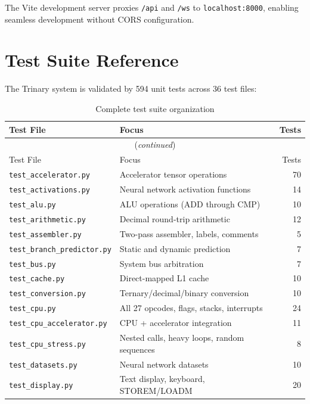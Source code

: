 \documentclass[10pt,a4paper,twoside]{book}
\begin{document}
The Vite development server proxies \texttt{/api} and \texttt{/ws} to
\texttt{localhost:8000}, enabling seamless development without CORS
configuration.

\appendix

\chapter{Test Suite Reference}
\label{app:tests}

The Trinary system is validated by 594 unit tests across 36 test files:

\begin{longtable}{llr}
\caption{Complete test suite organization}
\label{tab:testsuite} \\
\toprule
Test File & Focus & Tests \\
\midrule
\endfirsthead
\multicolumn{3}{c}{(\emph{continued})} \\
\toprule
Test File & Focus & Tests \\
\midrule
\endhead
\bottomrule
\endfoot
\texttt{test\_accelerator.py} & Accelerator tensor operations & 70 \\
\texttt{test\_activations.py} & Neural network activation functions & 14 \\
\texttt{test\_alu.py} & ALU operations (ADD through CMP) & 10 \\
\texttt{test\_arithmetic.py} & Decimal round-trip arithmetic & 12 \\
\texttt{test\_assembler.py} & Two-pass assembler, labels, comments & 5 \\
\texttt{test\_branch\_predictor.py} & Static and dynamic prediction & 7 \\
\texttt{test\_bus.py} & System bus arbitration & 7 \\
\texttt{test\_cache.py} & Direct-mapped L1 cache & 10 \\
\texttt{test\_conversion.py} & Ternary/decimal/binary conversion & 10 \\
\texttt{test\_cpu.py} & All 27 opcodes, flags, stacks, interrupts & 24 \\
\texttt{test\_cpu\_accelerator.py} & CPU + accelerator integration & 11 \\
\texttt{test\_cpu\_stress.py} & Nested calls, heavy loops, random sequences & 8 \\
\texttt{test\_datasets.py} & Neural network datasets & 10 \\
\texttt{test\_display.py} & Text display, keyboard, STOREM/LOADM & 20 \\

\end{longtable}
\end{document}
